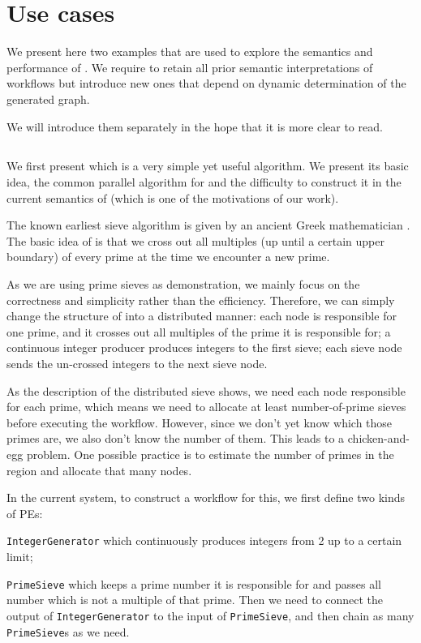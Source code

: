 \chapter{Use cases}
We present here two examples that are used to explore the semantics and performance of \dpy. We require to retain all prior semantic interpretations of workflows but introduce new ones that depend on dynamic determination of the generated graph.

We will introduce them separately in the hope that it is more clear to read.

\section{\tSieve}
We first present \ttsieve which is a very simple yet useful algorithm. We present its basic idea, the common parallel algorithm for \ttsieve and the difficulty to construct it in the current semantics of \dpy (which is one of the motivations of our work).

The known earliest sieve algorithm is \ttesieve given by an ancient Greek mathematician \cite{o2009genuine}. The basic idea of \ttesieve is that we cross out all multiples (up until a certain upper boundary) of every prime at the time we encounter a new prime.

As we are using prime sieves as demonstration, we mainly focus on the correctness and simplicity rather than the efficiency. Therefore, we can simply change the structure of \ttesieve into a distributed manner: each node is responsible for one prime, and it crosses out all multiples of the prime it is responsible for; a continuous integer producer produces integers to the first sieve; each sieve node sends the un-crossed integers to the next sieve node.

As the description of the distributed sieve shows, we need each node responsible for each prime, which means we need to allocate at least number-of-prime sieves before executing the workflow. However, since we don't yet know which those primes are, we also don't know the number of them. This leads to a chicken-and-egg problem. One possible practice is to estimate the number of primes in the region and allocate that many nodes.

\newcommand{\cdIntGen}{\lstinline|IntegerGenerator|\xspace}
\newcommand{\cdSieve}{\lstinline|PrimeSieve|\xspace}

In the current \dpy system, to construct a workflow for this, we first define two kinds of PEs:
\begin{enumerate*}
	\item \cdIntGen which continuously produces integers from 2 up to a certain limit;
	\item \cdSieve which keeps a prime number it is responsible for and passes all number which is not a multiple of that prime. Then we need to connect the output of \cdIntGen to the input of \cdSieve , and then chain as many \cdSieve{}s as we need.
\end{enumerate*}

